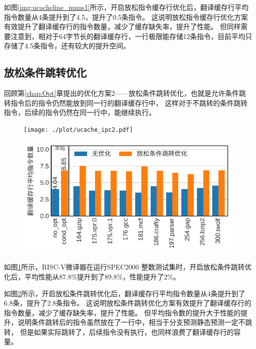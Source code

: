 如图\ref{img:ucacheline_nums1}所示，开启放松指令缓存行优化后，翻译缓存行平均指令数量从4条提升到了4.5，提升了0.5条指令。
这说明放松指令缓存行优化方案有效提升了翻译缓存行的指令数量，减少了缓存缺失率，提升了性能。
但同样需要注意到，相对于64字节长的翻译缓存行，一行极限能存储12条指令，目前平均只存储了4.5条指令，还有较大的提升空间。

\subsection{放松条件跳转优化}

回顾第\ref{chap:Opt}章提出的优化方案2——放松条件跳转优化，也就是允许条件跳转指令后的指令仍然能放到同一行的翻译缓存行中，
这样对于不跳转的条件跳转指令，后续的指令仍然在同一行中，能继续执行。

\begin{figure}[!htbp]
  \centering
  \texttt{[image: ./plot/ucache\_ipc2.pdf]}
  \label{img:ipc2}
\end{figure}

\begin{figure}[!htbp]
  \centering
  \includegraphics[width=0.8\linewidth]{./plot/ucacheline_nums2.pdf}
  \label{img:ucacheline_nums2}
\end{figure}


如图\ref{img:ipc2}所示，RISC-V微译器在运行SPEC2000 整数测试集时，开启放松条件跳转优化后，平均性能从87.8\%提升到了89.8\%，性能提升了2\%。

如图\ref{img:ucacheline_nums2}所示，开启放松条件跳转优化后，翻译缓存行平均指令数量从4条提升到了6.8条，提升了2.8条指令。
这说明放松条件跳转优化方案有效提升了翻译缓存行的指令数量，减少了缓存缺失率，提升了性能。
但平均指令数的提升大于性能的提升，说明条件跳转后的指令虽然放在了一行中，相当于分支预测静态预测一定不跳转，
但是如果实际跳转了，后续指令没有执行，也同样浪费了翻译缓存行的容量。


